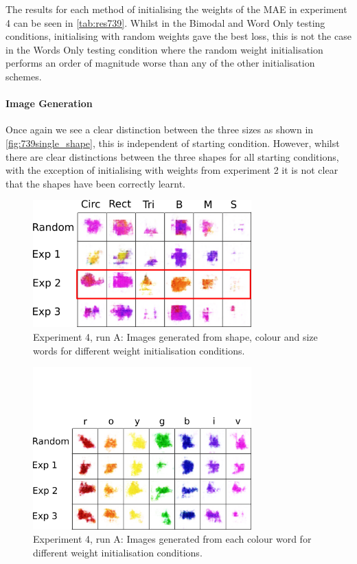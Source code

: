 The results for each method of initialising the weights of the MAE in experiment 4 can be seen in \autoref{tab:res739}. Whilst in the Bimodal and Word Only testing conditions, initialising with random weights gave the best loss, this is not the case in the Words Only testing condition where the random weight initialisation performs an order of magnitude worse than any of the other initialisation schemes.


\paragraph{Image Generation}

Once again we see a clear distinction between the three sizes as shown in \autoref{fig:739single_shape}, this is independent of starting condition. However, whilst there are clear distinctions between the three shapes for all starting conditions, with the exception of initialising with weights from experiment 2 it is not clear that the shapes have been correctly learnt.

\begin{figure}[h]
\centering
\includegraphics[width=0.75\textwidth]{Figs/shapes/singlelabel739_shape.png}
\caption{Experiment 4, run A: Images generated from shape, colour and size words for different weight initialisation conditions.}
\label{fig:739single_shape}
\end{figure}



\begin{figure}[h!]
\centering
\includegraphics[width=0.75\textwidth]{Figs/shapes/singlelabel739_col.png}
\caption{Experiment 4, run A: Images generated from each colour word for different weight initialisation conditions.}
\label{fig:739single_col}
\end{figure}

